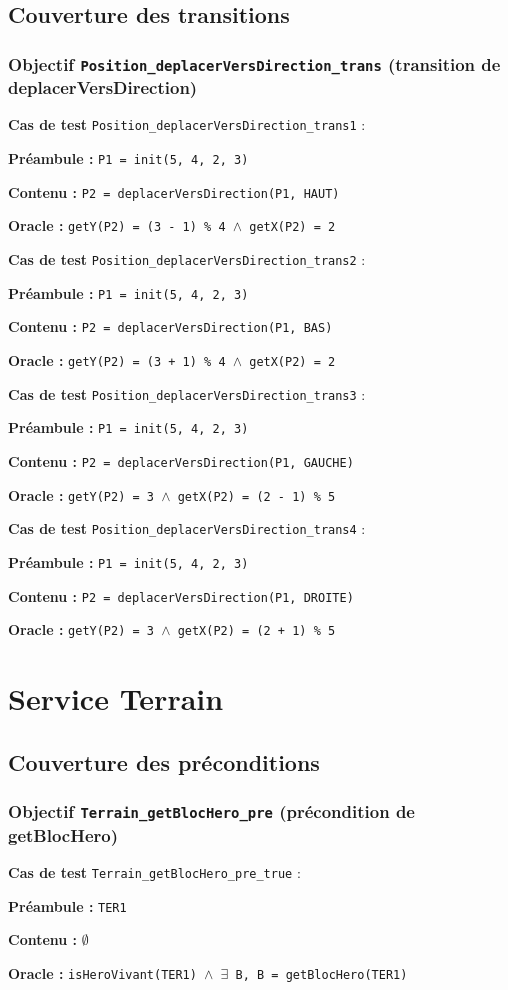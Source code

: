 \documentclass{article}
\newcommand{\cmd}[1]{\texttt{#1}}
\newcommand{\lAND}{$\land$}
\newcommand{\lEXISTS}{$\exists$}
\newcommand{\obj}[2]{\subsubsection*{\large{\textbf{Objectif {\cmd{#1} (#2)}}}}}
\newenvironment{cas}[1]
{
	\hspace{1em}\textbf{Cas de test} \cmd{#1} :
	\begin{list}{}{}
}{
	\end{list}\vspace{1em}
}
\newcommand{\pre}[1]{\item \textbf{Préambule :} \cmd{#1}}
\newcommand{\ope}[1]{\item \textbf{Contenu :} \cmd{#1}}
\newcommand{\nope}{\item \textbf{Contenu :} $\emptyset$}
\newcommand{\ora}[1]{\item \textbf{Oracle :} \cmd{#1}}
\begin{document}
\subsection*{Couverture des transitions}

\obj{Position\_deplacerVersDirection\_trans} {transition de deplacerVersDirection}
	\begin{cas} {Position\_deplacerVersDirection\_trans1}
		\pre{P1 = init(5, 4, 2, 3)}
		\ope{P2 = deplacerVersDirection(P1, HAUT)}
		\ora{getY(P2) = (3 - 1) \% 4 \lAND{} getX(P2) = 2}
	\end{cas}

	\begin{cas} {Position\_deplacerVersDirection\_trans2}
		\pre{P1 = init(5, 4, 2, 3)}
		\ope{P2 = deplacerVersDirection(P1, BAS)}
		\ora{getY(P2) = (3 + 1) \% 4 \lAND{} getX(P2) = 2}
	\end{cas}


	\begin{cas} {Position\_deplacerVersDirection\_trans3}
		\pre{P1 = init(5, 4, 2, 3)}
		\ope{P2 = deplacerVersDirection(P1, GAUCHE)}
		\ora{getY(P2) = 3 \lAND{} getX(P2) = (2 - 1) \% 5}
	\end{cas}


	\begin{cas} {Position\_deplacerVersDirection\_trans4}
		\pre{P1 = init(5, 4, 2, 3)}
		\ope{P2 = deplacerVersDirection(P1, DROITE)}
		\ora{getY(P2) = 3 \lAND{} getX(P2) = (2 + 1) \% 5}
	\end{cas}

\clearpage{}





















\section{Service Terrain}

\subsection*{Couverture des préconditions}

\obj{Terrain\_getBlocHero\_pre} {précondition de getBlocHero}
	\begin{cas} {Terrain\_getBlocHero\_pre\_true}
		\pre{TER1}
		\nope{}
		\ora{isHeroVivant(TER1) \lAND{} \lEXISTS{} B, B = getBlocHero(TER1)}
	\end{cas}
\end{document}
